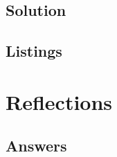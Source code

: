 \documentclass[12pt,a4paper,titlepage,oneside]{article}
\begin{document}
\subsection{Solution}

\subsection{Listings}

\newpage
\section{Reflections}



\subsection{Answers}
\end{document}
